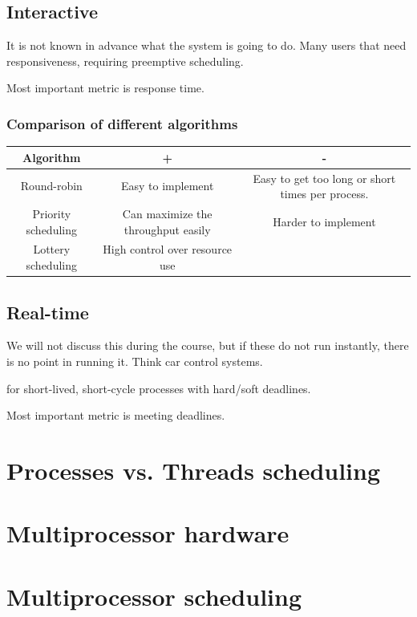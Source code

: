 \subsection{Interactive}
It is not known in advance what the system is  going to do. Many users that need responsiveness, requiring preemptive scheduling.

Most important metric is response time.

\subsubsection{Comparison of different algorithms}
\begin{tabular}{|c|c|c|}
	\hline
	Algorithm           & +                                  & -                                                \\\hline
	Round-robin         & Easy to implement                  & Easy to get too long or short times per process. \\\hline
	Priority scheduling & Can maximize the throughput easily & Harder to implement                              \\\hline
	Lottery scheduling  & High control over resource use     &                                                  \\
\end{tabular}

\subsection{Real-time}
We will not discuss this during the course, but if these do not run instantly, there is no point in running it. Think car control systems.

for short-lived, short-cycle processes with hard/soft deadlines.

Most important metric is meeting deadlines.

\section{Processes vs. Threads scheduling}

\section{Multiprocessor hardware}

\section{Multiprocessor scheduling}